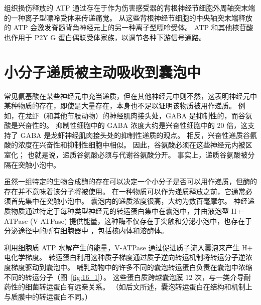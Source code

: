 组织损伤释放的 ATP 通过存在于作为伤害感受器的背根神经节细胞外周轴突末端的一种离子型嘌呤受体来传递痛觉。
从这些背根神经节细胞的中央轴突末端释放的 ATP 会激发脊髓背角神经元上的另一种离子型嘌呤受体。
ATP 和其他核苷酸也作用于 P2Y G 蛋白偶联受体家族，以调节各种下游信号通路。



\section{小分子递质被主动吸收到囊泡中}

常见氨基酸在某些神经元中充当递质，但在其他神经元中则不然，这表明神经元中某种物质的存在，即使是大量存在，本身也不足以证明该物质被用作递质。
例如，在龙虾（和其他节肢动物）的神经肌肉接头处，GABA 是抑制性的，而谷氨酸是兴奋性的。
抑制性细胞中的 GABA 浓度大约是兴奋性细胞中的 20 倍，这支持了 GABA 是龙虾神经肌肉接头处的抑制性递质的观点。
相反，兴奋性递质谷氨酸的浓度在兴奋性和抑制性细胞中相似。
因此，谷氨酸必须在这些神经元内被区室化；
也就是说，递质谷氨酸必须与代谢谷氨酸分开。
事实上，递质谷氨酸被分隔在突触小泡中。


虽然一组特定的生物合成酶的存在可以决定一个小分子是否可以用作递质，但酶的存在并不意味着该分子将被使用。
在一种物质可以作为递质释放之前，它通常必须首先集中在突触小泡中。
囊泡内的递质浓度很高，大约为数百毫摩尔。
神经递质物质通过特定于每种类型神经元的转运蛋白集中在囊泡中，并由液泡型 H+-ATPase (V-ATPase) 提供能量，这种酶不仅存在于突触和分泌小泡中，也存在于分泌途径中的所有细胞器中 ，包括核内体和溶酶体。


利用细胞质 ATP 水解产生的能量，V-ATPase 通过促进质子流入囊泡来产生 H+ 电化学梯度。
转运蛋白利用这种质子梯度通过质子逆向转运机制将转运分子逆浓度梯度驱动到囊泡中。
哺乳动物中的许多不同的囊泡转运蛋白负责在囊泡中浓缩不同的转运分子（图~\ref{fig:16_1}）。
这些蛋白质跨越囊泡膜 12 次，与一类介导耐药性的细菌转运蛋白有远亲关系。
（如后文所述，囊泡转运蛋白在结构和机制上与质膜中的转运蛋白不同。）


